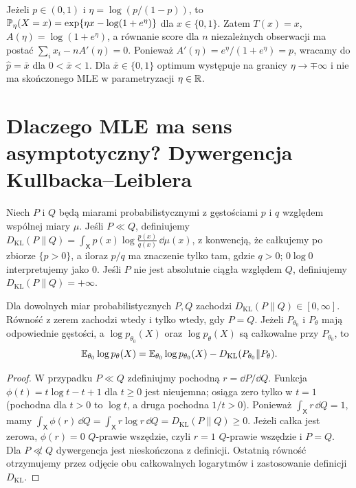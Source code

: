 \begin{przyklad}
Jeżeli $p\in(0,1)$ i $\eta=\log(p/(1-p))$, to
$\mathbb P_\eta(X=x)=\exp\{\eta x-\log(1+e^\eta)\}$ dla $x\in\{0,1\}$.
Zatem $T(x)=x$, $A(\eta)=\log(1+e^\eta)$, a równanie score dla
$n$ niezależnych obserwacji ma postać
$\sum_i x_i-nA'(\eta)=0$. Ponieważ
$A'(\eta)=e^\eta/(1+e^\eta)=p$, wracamy do
$\widehat p=\bar x$ dla $0<\bar x<1$.
Dla $\bar x\in\{0,1\}$ optimum występuje na granicy
$\eta\to\mp\infty$ i nie ma skończonego MLE w parametryzacji $\eta\in\mathbb R$.
\end{przyklad}

\section{Dlaczego MLE ma sens asymptotyczny? Dywergencja Kullbacka--Leiblera}
\begin{definicja}\label{def:kl}
Niech $P$ i $Q$ będą miarami probabilistycznymi z gęstościami $p$ i $q$
względem wspólnej miary $\mu$. Jeśli $P\ll Q$, definiujemy
$D_{\mathrm{KL}}(P\|Q)=\int_{\mathsf X}p(x)\log\frac{p(x)}{q(x)}\,\dd\mu(x)$,
z konwencją, że całkujemy po zbiorze $\{p>0\}$, a iloraz
$p/q$ ma znaczenie tylko tam, gdzie $q>0$; $0\log0$ interpretujemy jako $0$.
Jeśli $P$ nie jest absolutnie ciągła względem $Q$, definiujemy
$D_{\mathrm{KL}}(P\|Q)=+\infty$.
\end{definicja}
\begin{twierdzenie}\label{thm:kl-basic}
Dla dowolnych miar probabilistycznych $P,Q$ zachodzi
$D_{\mathrm{KL}}(P\|Q)\in[0,\infty]$. Równość z zerem zachodzi wtedy
i tylko wtedy, gdy $P=Q$. Jeżeli $P_{\theta_0}$ i $P_\theta$ mają
odpowiednie gęstości, a $\log p_{\theta_0}(X)$ oraz
$\log p_\theta(X)$ są całkowalne przy $P_{\theta_0}$, to
\[
\mathbb E_{\theta_0}\log p_\theta(X)
=\mathbb E_{\theta_0}\log p_{\theta_0}(X)
-D_{\mathrm{KL}}(P_{\theta_0}\|P_\theta).
\]
\end{twierdzenie}
\begin{proof}
W przypadku $P\ll Q$ zdefiniujmy pochodną $r=\dd P/\dd Q$.
Funkcja $\phi(t)=t\log t-t+1$ dla $t\ge0$ jest nieujemna;
osiąga zero tylko w $t=1$ (pochodna dla $t>0$ to $\log t$, a druga
pochodna $1/t>0$). Ponieważ $\int_{\mathsf X}r\,\dd Q=1$, mamy
$\int_{\mathsf X}\phi(r)\,\dd Q=\int_{\mathsf X}r\log r\,\dd Q=D_{\mathrm{KL}}(P\|Q)\ge0$.
Jeżeli całka jest zerowa, $\phi(r)=0$ $Q$-prawie wszędzie,
czyli $r=1$ $Q$-prawie wszędzie i $P=Q$.
Dla $P\not\ll Q$ dywergencja jest nieskończona z definicji.
Ostatnią równość otrzymujemy przez odjęcie obu całkowalnych logarytmów
i zastosowanie definicji $D_{\mathrm{KL}}$.
\end{proof}

